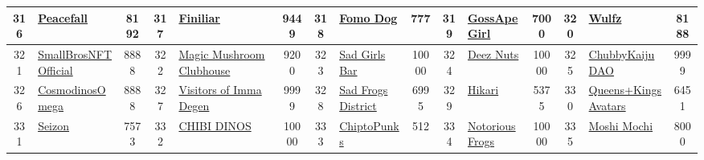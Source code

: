 \begin{table*}[]
{\begin{tabular}{|c|l|c|c|l|c|c|l|c|c|l|c|c|l|c|}
        316   & \href{https://peacefall.xyz/}{Peacefall}                                           & 8192              & 317   & \href{https://fini.world}{Finiliar}                                                               & 9449              & 318   & \href{https://www.fomodog.club/fdchome}{Fomo Dog}                                 & 777               & 319   & \href{https://gossapegirl.com}{GossApeGirl}                                   & 7000              & 320   & \href{https://wulfznft.com}{Wulfz}                                                        & 8188                                    \\ \hline
        321   & \href{https://smallbrosnft.app}{SmallBrosNFT Official}                             & 8888              & 322   & \href{https://www.magicmushroomclubnft.com}{Magic Mushroom Clubhouse}                             & 9200              & 323   & \href{https://sadgirlsbar.io}{Sad Girls Bar}                                      & 10000             & 324   & \href{https://www.deeznft.io/}{Deez Nuts}                                     & 10000             & 325   & \href{https://chubbykaijudao.com/}{ChubbyKaijuDAO}                                        & 9999                                    \\ \hline
        326   & \href{http://www.cosmodinos.com}{CosmodinosOmega}                                  & 8888              & 327   & \href{https://www.immadegen.com/}{Visitors of Imma Degen}                                         & 9999              & 328   & \href{https://opensea.io/collection/sad-frogs-district}{Sad Frogs District}       & 6995              & 329   & \href{https://www.hikarinft.com/}{Hikari}                                     & 5375              & 330   & \href{https://queenskings.hackatao.com/}{Queens+KingsAvatars}                             & 6451                                    \\ \hline
        331   & \href{https://opensea.io/collection/seizonofficial}{Seizon}                        & 7573              & 332   & \href{https://chibidinos.io}{CHIBI DINOS}                                                         & 10000             & 333   & \href{https://chiptos.io}{ChiptoPunks}                                            & 512               & 334   & \href{https://frogland.io/}{Notorious Frogs}                                  & 10000             & 335   & \href{https://moshimochi.xyz}{Moshi Mochi}                                                & 8000                                    \\ \hline

\end{tabular}}
\end{table*}
